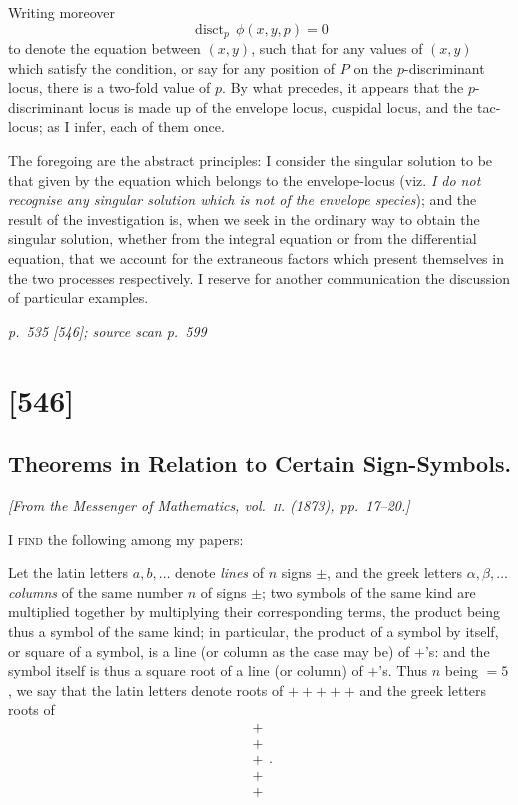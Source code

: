 \documentclass[11pt,a4paper]{article}
\newcommand{\sourcepage}[3]{%
  \bigskip
  \noindent\textit{p.~#1 [#2]; source scan p.~#3}%
  \par\smallskip
}
\begin{document}
Writing moreover
\[
\operatorname{disct}_{p}\,\phi(x,y,p)=0
\]
to denote the equation between $(x,y)$, such that for any values of $(x,y)$
which satisfy the condition, or say for any position of $P$ on the
$p$-discriminant locus, there is a two-fold value of $p$. By what precedes,
it appears that the $p$-discriminant locus is made up of the envelope locus,
cuspidal locus, and the tac-locus; as I infer, each of them once.

The foregoing are the abstract principles: I consider the singular solution
to be that given by the equation which belongs to the envelope-locus (viz.
\textit{I do not recognise any singular solution which is not of the envelope
species}); and the result of the investigation is, when we seek in the
ordinary way to obtain the singular solution, whether from the integral
equation or from the differential equation, that we account for the
extraneous factors which present themselves in the two processes
respectively. I reserve for another communication the discussion of
particular examples.

\clearpage

\sourcepage{535}{546}{599}
\section{[546]}
\subsection{Theorems in Relation to Certain Sign-Symbols.}

\begin{center}
\textit{[From the Messenger of Mathematics, vol.~\textsc{ii}. (1873),
pp.~17--20.]}
\end{center}

\textsc{I find} the following among my papers:

Let the latin letters $a,b,\ldots$ denote \textit{lines} of $n$ signs
$\pm$, and the greek letters $\alpha,\beta,\ldots$ \textit{columns} of the
same number $n$ of signs $\pm$; two symbols of the same kind are multiplied
together by multiplying their corresponding terms, the product being thus a
symbol of the same kind; in particular, the product of a symbol by itself,
or square of a symbol, is a line (or column as the case may be) of $+$'s:
and the symbol itself is thus a square root of a line (or column) of $+$'s.
Thus $n$ being $=5$, we say that the latin letters denote roots of
$+++++$ and the greek letters roots of
\[
\begin{matrix}
+\\ +\\ +\\ +\\ +
\end{matrix}.
\]
\end{document}
